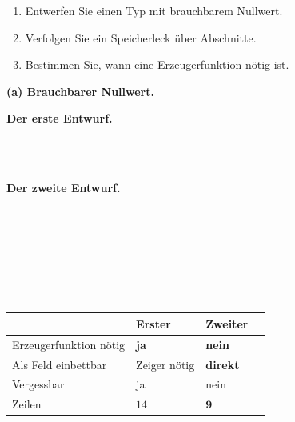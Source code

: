 \begin{aufgabe}
\begin{enumerate}[label=(\alph*)]
\item Entwerfen Sie einen Typ mit brauchbarem Nullwert.
\item Verfolgen Sie ein Speicherleck über Abschnitte.
\item Bestimmen Sie, wann eine Erzeugerfunktion nötig ist.
\end{enumerate}

\loesung
\textbf{(a) Brauchbarer Nullwert.}

\textbf{Der erste Entwurf.}

\begin{center}
\begin{minipage}{0.9\textwidth}
\\
\\
\end{minipage}
\end{center}

\begin{center}
\end{center}

\textbf{Der zweite Entwurf.}

\begin{center}
\begin{minipage}{0.9\textwidth}
\\
\\
\\
\code{\}}\\
\\
\\
\end{minipage}
\end{center}

\begin{center}
\renewcommand{\arraystretch}{1.45}
\begin{tabular}{@{}P{3.0cm}P{2.2cm}P{2.4cm}P{1.6cm}@{}}
\toprule
& \textbf{Erster} & \textbf{Zweiter} & \\
\midrule
Erzeugerfunktion nötig & \textcolor{akzent}{\textbf{ja}} & \textcolor{gruen}{\textbf{nein}} & \\
Als Feld einbettbar & \textcolor{akzent}{Zeiger nötig} & \textcolor{gruen}{\textbf{direkt}} & \\
Vergessbar & \textcolor{akzent}{ja} & \textcolor{gruen}{nein} & \\
Zeilen & $14$ & $\mathbf{9}$ & \\
\bottomrule
\end{tabular}
\end{center}


\end{aufgabe}
